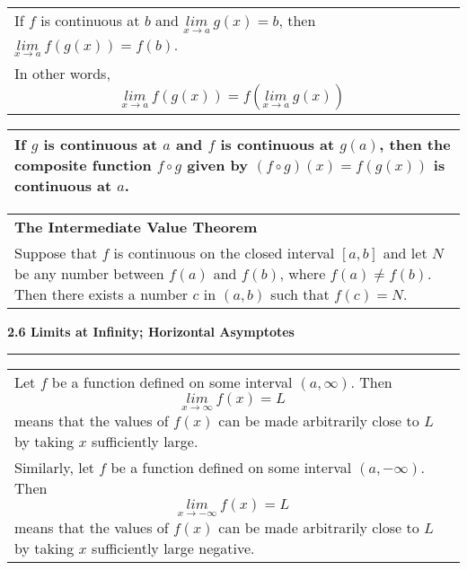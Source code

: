 \documentclass[fleqn]{article}
\begin{document}
\begin{center}
\def\arraystretch{1.3}
{\setlength{\tabcolsep}{16pt}
\begin{tabularx}{.9\textwidth}{|X|}
\hline
	\vspace{1pt}
	If $f$ is continuous at $b$ and $\underset{x \to a}{lim} \: g(x) = b$, then $\underset{x \to a}{lim} \: f(g(x)) = f(b)$. \\
	In other words,
	$$\underset{x \to a}{lim} \: f(g(x)) = f(\underset{x \to a}{lim} \: g(x))$$ \\
\hline
\end{tabularx}}
\vspace{12pt}

\def\arraystretch{1.3}
{\setlength{\tabcolsep}{16pt}
\begin{tabularx}{.9\textwidth}{|X|}
\hline
	\vspace{1pt}
	If $g$ is continuous at $a$ and $f$ is continuous at $g(a)$, then the composite function $f \circ g$ given by $(f \circ g)(x) = f(g(x))$ is continuous at $a$. \\[16pt]
	\hline
\end{tabularx}}
\vspace{12pt}

\def\arraystretch{1.3}
{\setlength{\tabcolsep}{16pt}
\begin{tabularx}{.9\textwidth}{|X|}
\hline
	\vspace{1pt}
	\textbf{The Intermediate Value Theorem} \\
	Suppose that $f$ is continuous on the closed interval $[a, b]$ and let $N$ be any number between $f(a)$ and $f(b)$, where $f(a) \ne f(b)$. Then there exists a number $c$ in $(a, b)$ such that $f(c) = N$. \\[16pt]
	\hline
\end{tabularx}}
\vspace{32pt}

\pagebreak

\Large\textbf{2.6 Limits at Infinity; Horizontal Asymptotes}

\noindent\hfill\rule{0.3\textwidth}{.4pt}\hfill
\vspace{12pt}

\large
\def\arraystretch{1.3}
{\setlength{\tabcolsep}{16pt}
\begin{tabularx}{.9\textwidth}{|X|}
\hline
	\vspace{1pt}
	Let $f$ be a function defined on some interval $(a, \infty)$. Then 
	$$\underset{x \to \infty}{lim} \: f(x) = L$$
	means that the values of $f(x)$ can be made arbitrarily close to $L$ by taking $x$ sufficiently large. \\[5pt]
	Similarly, let $f$ be a function defined on some interval $(a, -\infty)$. Then 
	$$\underset{x \to -\infty}{lim} \: f(x) = L$$
	means that the values of $f(x)$ can be made arbitrarily close to $L$ by taking $x$ sufficiently large negative. \\[16pt]
	\hline
\end{tabularx}}
\vspace{12pt}


\end{center}
\end{document}
